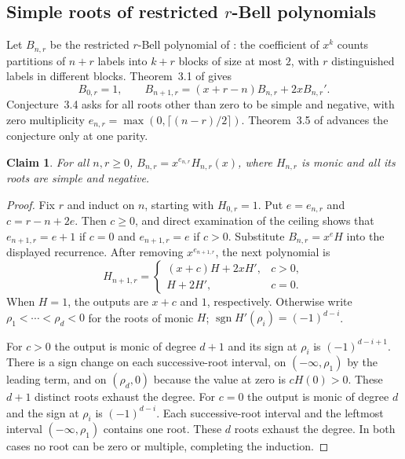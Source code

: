 \documentclass[11pt,a4paper]{article}
\newtheorem{SourceRbiRtheorem}{Claim}
\begin{document}
\subsection{Simple roots of restricted $r$-Bell polynomials}
Let $B_{n,r}$ be the restricted $r$-Bell polynomial of \cite{R18R:AN}:
the coefficient of $x^k$ counts partitions of $n+r$ labels into $k+r$
blocks of size at most $2$, with $r$ distinguished labels in different blocks.
Theorem~3.1 of \cite{R18R:AN} gives
\[
B_{0,r}=1,\qquad B_{n+1,r}=(x+r-n)B_{n,r}+2xB_{n,r}'.
\]
Conjecture~3.4 asks for all roots other than zero to be simple and negative,
with zero multiplicity $e_{n,r}=\max(0,\lceil(n-r)/2\rceil)$.
Theorem~3.5 of \cite{R18R:AN} advances the conjecture only at one parity.

\begin{SourceRbiRtheorem}
For all $n,r\ge0$, $B_{n,r}=x^{e_{n,r}}H_{n,r}(x)$, where $H_{n,r}$
is monic and all its roots are simple and negative.
\end{SourceRbiRtheorem}
\begin{proof}
Fix $r$ and induct on $n$, starting with $H_{0,r}=1$.
Put $e=e_{n,r}$ and $c=r-n+2e$. Then $c\ge0$, and direct examination
of the ceiling shows that $e_{n+1,r}=e+1$ if $c=0$ and $e_{n+1,r}=e$
if $c>0$. Substitute $B_{n,r}=x^e H$ into the displayed recurrence.
After removing $x^{e_{n+1,r}}$, the next polynomial is
\[
   H_{n+1,r}=
   \begin{cases}
     (x+c)H+2xH',&c>0,\\
     H+2H',&c=0.
   \end{cases}
\]
When $H=1$, the outputs are $x+c$ and $1$, respectively. Otherwise write
$\rho_1<\cdots<\rho_d<0$ for the roots of monic $H$;
$\operatorname{sgn}H'(\rho_i)=(-1)^{d-i}$.

For $c>0$ the output is monic of degree $d+1$ and its sign at $\rho_i$
is $(-1)^{d-i+1}$. There is a sign change on each successive-root interval,
on $(-\infty,\rho_1)$ by the leading term, and on $(\rho_d,0)$ because
the value at zero is $cH(0)>0$. These $d+1$ distinct roots exhaust the degree.
For $c=0$ the output is monic of degree $d$ and the sign at $\rho_i$ is
$(-1)^{d-i}$. Each successive-root interval and the leftmost interval
$(-\infty,\rho_1)$ contains one root. These $d$ roots exhaust the degree.
In both cases no root can be zero or multiple, completing the induction.
\end{proof}
\end{document}
